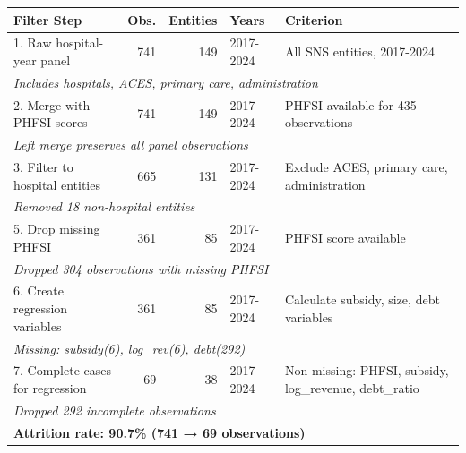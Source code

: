 \begin{tabular}{lrrp{3.5cm}p{4cm}}
\toprule
Filter Step & Obs. & Entities & Years & Criterion \\
\midrule
1. Raw hospital-year panel & 741 & 149 & 2017-2024 & \small{All SNS entities, 2017-2024} \\
\multicolumn{5}{l}{\hspace{0.5cm}\textit{\footnotesize Includes hospitals, ACES, primary care, administration}} \\
2. Merge with PHFSI scores & 741 & 149 & 2017-2024 & \small{PHFSI available for 435 observations} \\
\multicolumn{5}{l}{\hspace{0.5cm}\textit{\footnotesize Left merge preserves all panel observations}} \\
3. Filter to hospital entities & 665 & 131 & 2017-2024 & \small{Exclude ACES, primary care, administration} \\
\multicolumn{5}{l}{\hspace{0.5cm}\textit{\footnotesize Removed 18 non-hospital entities}} \\
5. Drop missing PHFSI & 361 & 85 & 2017-2024 & \small{PHFSI score available} \\
\multicolumn{5}{l}{\hspace{0.5cm}\textit{\footnotesize Dropped 304 observations with missing PHFSI}} \\
6. Create regression variables & 361 & 85 & 2017-2024 & \small{Calculate subsidy, size, debt variables} \\
\multicolumn{5}{l}{\hspace{0.5cm}\textit{\footnotesize Missing: subsidy(6), log_rev(6), debt(292)}} \\
7. Complete cases for regression & 69 & 38 & 2017-2024 & \small{Non-missing: PHFSI, subsidy, log_revenue, debt_ratio} \\
\multicolumn{5}{l}{\hspace{0.5cm}\textit{\footnotesize Dropped 292 incomplete observations}} \\
\midrule
\multicolumn{5}{l}{\textbf{Attrition rate: 90.7\% (741 → 69 observations)}} \\
\bottomrule
\end{tabular}